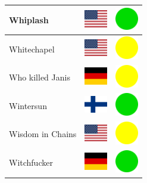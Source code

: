 \documentclass[12pt, a4paper, twoside]{report}
\begin{document}
\begin{center}
\begin{longtable}{|p{5cm}|p{2cm}|p{2cm}|}
 Whiplash                                                   & \includegraphics[width=1cm]{4x3/us} &   \includegraphics[width=1cm]{likes/y} \\ \hline
 Whitechapel                                                & \includegraphics[width=1cm]{4x3/us} &   \includegraphics[width=1cm]{likes/m} \\ \hline
 Who killed Janis                                           & \includegraphics[width=1cm]{4x3/de} &   \includegraphics[width=1cm]{likes/m} \\ \hline
 Wintersun                                                  & \includegraphics[width=1cm]{4x3/fi} &   \includegraphics[width=1cm]{likes/y} \\ \hline
 Wisdom in Chains                                           & \includegraphics[width=1cm]{4x3/us} &   \includegraphics[width=1cm]{likes/m} \\ \hline
 Witchfucker                                                & \includegraphics[width=1cm]{4x3/de} &   \includegraphics[width=1cm]{likes/y} \\ \hline

\end{longtable}
\end{center}
\end{document}
